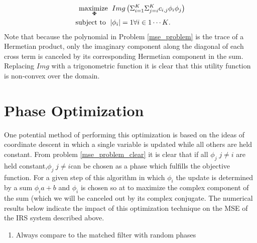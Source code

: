 \documentclass[12pt,a4paper]{report}
\begin{document}
	\begin{align}
	    \underset{\boldsymbol{\Phi}}{\text{maximize }}
	    & \; Img \left( \Sigma_{i=1}^{K} \Sigma_{j=i}^{K} c_{i,j} \phi_{i} \phi_{j}  \right)
	     \\
	    \text{subject to  } \; &
	    | \phi_i | = 1  \forall i \in {1 \cdots	 K}.
	\end{align}\label{mse_problem_clear}
	Note that because the polynomial in Problem \eqref{mse_problem} is the trace of a Hermetian product, only the imaginary component along the diagonal of each cross term is canceled by its corresponding Hermetian component in the sum. Replacing $ Img$ with a trigonometric function it is clear that this utility function is non-convex over the domain.
\section{Phase Optimization}
One potential method of performing this optimization is based on the ideas of coordinate descent in which a single variable is updated while all others are held constant.
From problem \eqref{mse_problem_clear} it is clear that if all $\phi_{j} \; j \neq i $ are held constant,$\phi_{j} \; j \neq i $can be chosen as a phase which fulfills the objective function. 
For a given step of this algorithm in which $\phi_{i}$ the update is determined by a sum $\phi_{i}a + b$ and $\phi_{i}$ is chosen so at to maximize the 
complex component of the sum (which we will be canceled out by its complex conjugate.
The numerical results below indicate the impact of this optimization technique on the MSE of the IRS system described above. 

\begin{enumerate}
\item
	Always compare to the matched filter with random phases
\end{enumerate}

\end{document}

